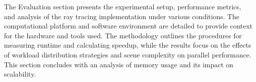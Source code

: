 The Evaluation section presents the experimental setup, performance metrics, and analysis of the ray tracing implementation under various conditions. The computational platform and software environment are detailed to provide context for the hardware and tools used. The methodology outlines the procedures for measuring runtime and calculating speedup, while the results focus on the effects of workload distribution strategies and scene complexity on parallel performance. This section concludes with an analysis of memory usage and its impact on scalability.
